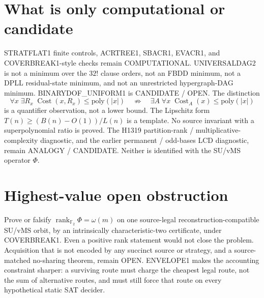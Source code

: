 \documentclass[11pt]{article}
\begin{document}
\section*{What is only computational or candidate}
STRATFLAT1 finite controls, ACRTREE1, SBACR1, EVACR1, and COVERBREAK1-style checks remain
COMPUTATIONAL. UNIVERSALDAG2 is not a minimum over the \(32!\) clause orders, not an FBDD
minimum, not a DPLL residual-state minimum, and not an unrestricted hypergraph-DAG minimum.
BINARYDOF\_UNIFORM1 is CANDIDATE / OPEN. The distinction
\[
\forall x\;\exists R_x\;\operatorname{Cost}(x,R_x)\le\mathrm{poly}(|x|)
\quad\not\Rightarrow\quad
\exists A\;\forall x\;\operatorname{Cost}_A(x)\le\mathrm{poly}(|x|)
\]
is a quantifier observation, not a lower bound. The Lipschitz form
\(T(n)\ge (B(n)-O(1))/L(n)\) is a template. No source invariant with a superpolynomial ratio
is proved. The H1319 partition-rank / multiplicative-complexity diagnostic, and the earlier
permanent / odd-bases LCD diagnostic, remain ANALOGY / CANDIDATE. Neither is identified with
the SU/vMS operator \(\Phi\).

\section*{Highest-value open obstruction}
Prove or falsify \(\operatorname{rank}_{\mathbb F_2}\Phi=\omega(m)\) on one source-legal
reconstruction-compatible SU/vMS orbit, by an intrinsically characteristic-two certificate,
under COVERBREAK1. Even a positive rank statement would not close the problem. Acquisition
that is not encoded by any succinct source or strategy, and a source-matched no-sharing
theorem, remain OPEN. ENVELOPE1 makes the accounting constraint sharper: a surviving route
must charge the cheapest legal route, not the sum of alternative routes, and must still
force that route on every hypothetical static SAT decider.
\end{document}
